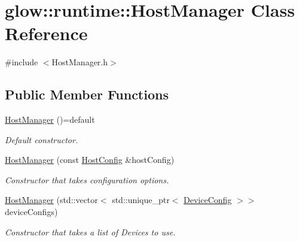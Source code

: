 \hypertarget{classglow_1_1runtime_1_1_host_manager}{}\section{glow\+:\+:runtime\+:\+:Host\+Manager Class Reference}
\label{classglow_1_1runtime_1_1_host_manager}


{\ttfamily \#include $<$Host\+Manager.\+h$>$}

\subsection*{Public Member Functions}
\begin{DoxyCompactItemize}
\item 
\mbox{\label{classglow_1_1runtime_1_1_host_manager_ab6c8d08c393bd511544b59b66c173b58}} 
\hyperlink{classglow_1_1runtime_1_1_host_manager_ab6c8d08c393bd511544b59b66c173b58}{Host\+Manager} ()=default
\begin{DoxyCompactList}\small\item\em Default constructor. \end{DoxyCompactList}\item 
\mbox{\label{classglow_1_1runtime_1_1_host_manager_ad30a764e2aa235864bda22cb417481d3}} 
\hyperlink{classglow_1_1runtime_1_1_host_manager_ad30a764e2aa235864bda22cb417481d3}{Host\+Manager} (const \hyperlink{structglow_1_1runtime_1_1_host_config}{Host\+Config} \&host\+Config)
\begin{DoxyCompactList}\small\item\em Constructor that takes configuration options. \end{DoxyCompactList}\item 
\mbox{\label{classglow_1_1runtime_1_1_host_manager_a993540bff98f21c7f7a63a7b012b0697}} 
\hyperlink{classglow_1_1runtime_1_1_host_manager_a993540bff98f21c7f7a63a7b012b0697}{Host\+Manager} (std\+::vector$<$ std\+::unique\+\_\+ptr$<$ \hyperlink{structglow_1_1runtime_1_1_device_config}{Device\+Config} $>$$>$ device\+Configs)
\begin{DoxyCompactList}\small\item\em Constructor that takes a list of Devices to use. \end{DoxyCompactList}\item 
$$
\end{DoxyCompactItemize}
